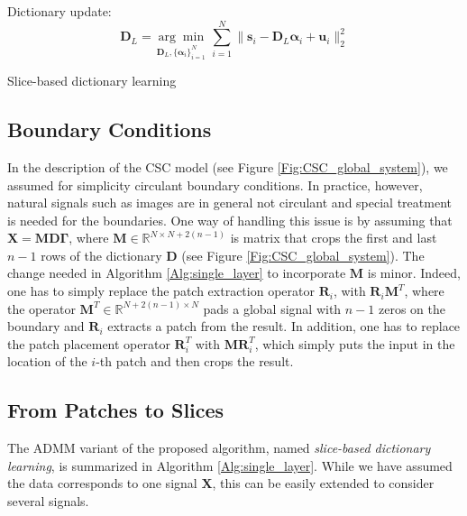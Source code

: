 \documentclass[10pt,twocolumn,letterpaper]{article}
\def\s{{\mathbf s}}
\def\X{{\mathbf X}}
\def\u{ \mathbf{u}}
\def\u{{\mathbf u}}
\def\D{{\mathbf D}}
\def\M{{\mathbf{M}}}
\def\R{{\mathbf R}}
\def\alfa{{\boldsymbol \alpha}}
\def\Gama{{\boldsymbol \Gamma}}
\begin{document}
\begin{algorithm}[t]
{		\vspace{-0.3cm}
		 
		Dictionary update: \vspace{-0.5cm}
		\begin{equation}
		\D_L = \underset{\D_L, \{ \alfa_i \}_{i=1}^N}{\arg\min} \ \sum_{i=1}^N \| \s_i - \D_L \alfa_i + \u_i \|_2^2
		\end{equation}
		
		 \vspace{-0.4cm}
	}
	\caption{Slice-based dictionary learning} \label{Alg:single_layer}
\end{algorithm}

\subsection{Boundary Conditions} \label{Sec:boundaries}
In the description of the CSC model (see Figure \ref{Fig:CSC_global_system}), we assumed for simplicity circulant boundary conditions. In practice, however, natural signals such as images are in general not circulant and special treatment is needed for the boundaries. One way of handling this issue is by assuming that $\X = \M \D \Gama$, where $\M \in \mathbb{R}^{N \times N+2(n-1)}$ is matrix that crops the first and last $n-1$ rows of the dictionary $\D$ (see Figure \ref{Fig:CSC_global_system}). The change needed in Algorithm \ref{Alg:single_layer} to incorporate $\M$ is minor. Indeed, one has to simply replace the patch extraction operator $\R_i$, with $\R_i \M^T$, where the operator $\M^T \in \mathbb{R}^{N+2(n-1) \times N}$ pads a global signal with $n-1$ zeros on the boundary and $\R_i$ extracts a patch from the result. In addition, one has to replace the patch placement operator $\R_i^T$ with $\M \R_i^T$, which simply puts the input in the location of the $i$-th patch and then crops the result.

\subsection{From Patches to Slices}
The ADMM variant of the proposed algorithm, named \textit{slice-based dictionary learning}, is summarized in Algorithm \ref{Alg:single_layer}. While we have assumed the data corresponds to one signal $\X$, this can be easily extended to consider several signals.
\end{document}
